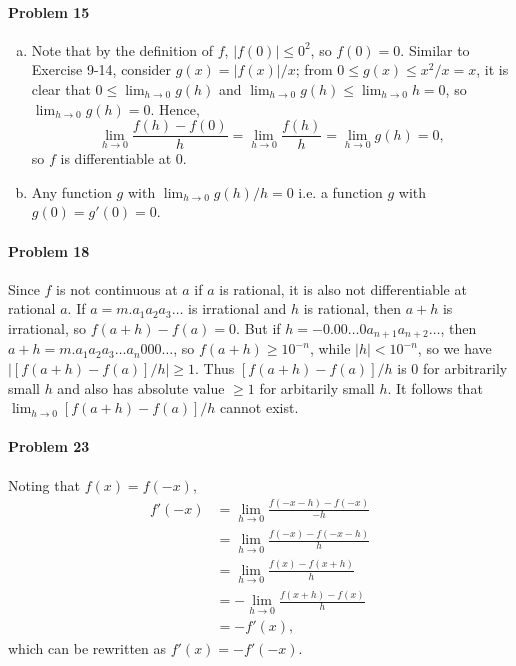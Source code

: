 \documentclass{article}
\begin{document}
\paragraph{Problem 15}
\begin{enumerate}[(a)]
  \item Note that by the definition of $f$, $|f(0)| \leq 0^2$, so $f(0) = 0$.
    Similar to Exercise 9-14, consider $g(x) = |f(x)|/x$; from $0 \leq g(x)
    \leq x^2/x = x$, it is clear that $0 \leq \lim_{h \to 0} g(h)$ and
    $\lim_{h \to 0} g(h) \leq \lim_{h \to 0} h = 0$, so $\lim_{h \to 0} g(h) =
    0$. Hence, \[
      \lim_{h \to 0} \frac{f(h) - f(0)}{h}
      = \lim_{h \to 0} \frac{f(h)}{h}
      = \lim_{h \to 0} g(h) = 0,
    \] so $f$ is differentiable at 0.
  \item Any function $g$ with $\lim_{h \to 0} g(h)/h = 0$ i.e. a function $g$
    with $g(0) = g'(0) = 0$.
\end{enumerate}

\paragraph{Problem 18} Since $f$ is not continuous at $a$ if $a$ is rational,
it is also not differentiable at rational $a$. If $a = m.a_1a_2a_3\ldots$ is
irrational and $h$ is rational, then $a + h$ is irrational, so $f(a + h) - f(a)
= 0$. But if $h = -0.00\ldots0a_{n+1}a_{n+2}\ldots$, then $a + h = m.a_1a_2a_3
\ldots a_n000\ldots$, so $f(a + h) \geq 10^{-n}$, while $|h| < 10^{-n}$, so we
have $|[f(a + h) - f(a)]/h| \geq 1$. Thus $[f(a + h) - f(a)]/h$ is 0 for
arbitrarily small $h$ and also has absolute value $\geq 1$ for arbitarily small
$h$. It follows that $\lim_{h \to 0} [f(a + h) - f(a)]/h$ cannot exist.

\paragraph{Problem 23} Noting that $f(x) = f(-x)$,
\begin{align*}
  f'(-x) &= \lim_{h \to 0}\frac{f(-x - h) - f(-x)}{-h} \\
         &= \lim_{h \to 0}\frac{f(-x) - f(-x - h)}{h} \\
         &= \lim_{h \to 0}\frac{f(x) - f(x + h)}{h} \\
         &= -\lim_{h \to 0}\frac{f(x + h) - f(x)}{h} \\
         &= -f'(x),
\end{align*}
which can be rewritten as $f'(x) = -f'(-x)$.
\end{document}

